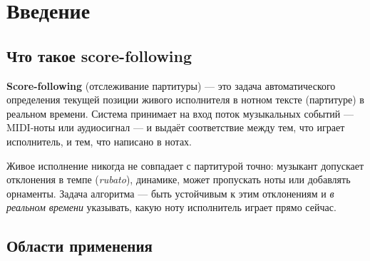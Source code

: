 \documentclass[a4paper,11pt]{article}
\begin{document}
\begin{titlepage}
\end{titlepage}

\newpage
\tableofcontents
\newpage

\section{Введение}
\label{sec:intro}

\subsection{Что такое score-following}

\textbf{Score-following} (отслеживание партитуры) --- это задача автоматического
определения текущей позиции живого исполнителя в нотном тексте (партитуре)
в реальном времени. Система принимает на вход поток музыкальных событий ---
MIDI-ноты или аудиосигнал --- и выдаёт соответствие между тем, что играет
исполнитель, и тем, что написано в нотах.

Живое исполнение никогда не совпадает с партитурой точно: музыкант допускает
отклонения в темпе (\emph{rubato}), динамике, может пропускать ноты или
добавлять орнаменты. Задача алгоритма --- быть устойчивым к этим отклонениям
и \emph{в реальном времени} указывать, какую ноту исполнитель играет прямо сейчас.

\subsection{Области применения}
\end{document}

